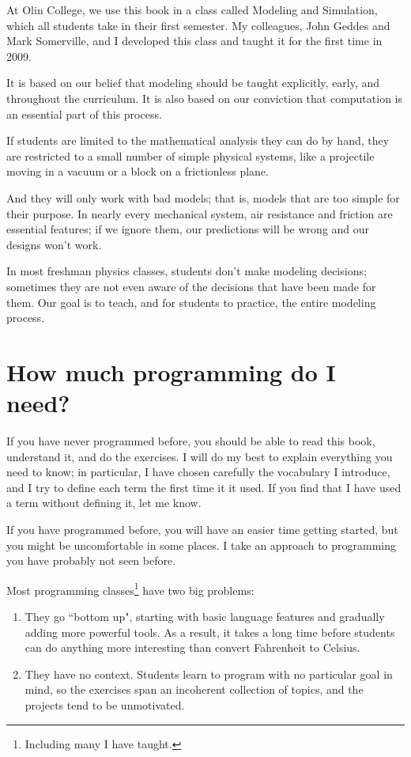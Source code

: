 \documentclass[12pt]{book}
\theoremstyle{exercise}
\begin{document}
At Olin College, we use this book in a class called Modeling and Simulation, which all students take in their first semester.  My colleagues, John Geddes and Mark Somerville, and I developed this class and taught it for the first time in 2009.

It is based on our belief that modeling should be taught explicitly, early, and throughout the curriculum.  It is also based on our conviction that computation is an essential part of this process.

If students are limited to the mathematical analysis they can do by hand, they are restricted to a small number of simple physical systems, like a projectile moving in a vacuum or a block on a frictionless plane.

And they will only work with bad models; that is, models that are too simple for their purpose.  In nearly every mechanical system, air resistance and friction are essential features; if we ignore them, our predictions will be wrong and our designs won't work.

In most freshman physics classes, students don't make modeling decisions; sometimes they are not even aware of the decisions that have been made for them.  Our goal is to teach, and for students to practice, the entire modeling process.


\section{How much programming do I need?}

If you have never programmed before, you should be able to read this book, understand it, and do the exercises.  I will do my best to explain everything you need to know; in particular, I have chosen carefully the vocabulary I introduce, and I try to define each term the first time it it used.  If you find that I have used a term without defining it, let me know.

If you have programmed before, you will have an easier time getting started, but you might be uncomfortable in some places.  I take an approach to programming you have probably not seen before.

Most programming classes\footnote{Including many I have taught.} have two big problems:

\begin{enumerate}

\item They go ``bottom up", starting with basic language features and gradually adding more powerful tools.  As a result, it takes a long time before students can do anything more interesting than convert Fahrenheit to Celsius.

\item They have no context.  Students learn to program with no particular goal in mind, so the exercises span an incoherent collection of topics, and the projects tend to be unmotivated.

\end{enumerate}
\end{document}
